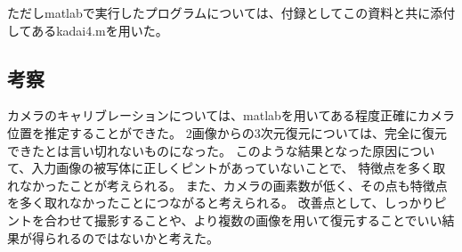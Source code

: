 \documentclass[]{jarticle}          %
\begin{document}
\newline
ただしmatlabで実行したプログラムについては、付録としてこの資料と共に添付してあるkadai4.mを用いた。
\subsection{考察}
カメラのキャリブレーションについては、matlabを用いてある程度正確にカメラ位置を推定することができた。
2画像からの3次元復元については、完全に復元できたとは言い切れないものになった。
このような結果となった原因について、入力画像の被写体に正しくピントがあっていないことで、
特徴点を多く取れなかったことが考えられる。
また、カメラの画素数が低く、その点も特徴点を多く取れなかったことにつながると考えられる。
改善点として、しっかりピントを合わせて撮影することや、より複数の画像を用いて復元することでいい結果が得られるのではないかと考えた。
\end{document}
